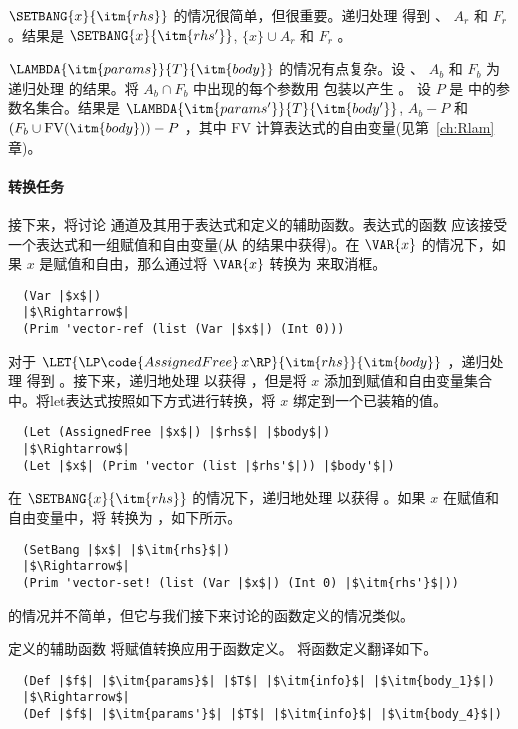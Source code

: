 \documentclass[11pt]{book}
\begin{document}
 $\SETBANG{x}{\itm{rhs}}$ 的情况很简单，但很重要。递归处理  得到  、 $A_r$
和 $F_r$ 。结果是 $\SETBANG{x}{\itm{rhs'}}$, $\{x\} \cup A_r$ 和 $F_r$ 。

 $\LAMBDA{\itm{params}}{T}{\itm{body}}$ 的情况有点复杂。设  、 $A_b$ 和 $F_b$ 为递归处理  的结果。将 $A_b \cap F_b$ 中出现的每个参数用  包装以产生  。
设 $P$ 是  中的参数名集合。结果是
$\LAMBDA{\itm{params'}}{T}{\itm{body'}}$, $A_b - P$ 和 $(F_b \cup
\mathrm{FV}(\itm{body})) - P$ ，其中 $\mathrm{FV}$ 计算表达式的自由变量(见第~\ref{ch:Rlam} 章)。

\paragraph{转换任务}

接下来，将讨论  通道及其用于表达式和定义的辅助函数。表达式的函数  应该接受一个表达式和一组赋值和自由变量(从
 的结果中获得)。在 $\VAR{x}$ 的情况下，如果 $x$ 是赋值和自由，那么通过将 $\VAR{x}$ 转换为  来取消框。
\begin{lstlisting}
  (Var |$x$|)
  |$\Rightarrow$|
  (Prim 'vector-ref (list (Var |$x$|) (Int 0)))
\end{lstlisting}
%
对于 $\LET{\LP\code{AssignedFree}\,
  x\RP}{\itm{rhs}}{\itm{body}}$ ，递归处理  得到  。接下来，递归地处理  以获得
 ，但是将 $x$ 添加到赋值和自由变量集合中。将let表达式按照如下方式进行转换，将 $x$ 绑定到一个已装箱的值。
\begin{lstlisting}
  (Let (AssignedFree |$x$|) |$rhs$| |$body$|)
  |$\Rightarrow$|
  (Let |$x$| (Prim 'vector (list |$rhs'$|)) |$body'$|)
\end{lstlisting}
%
在 $\SETBANG{x}{\itm{rhs}}$ 的情况下，递归地处理
 以获得  。如果 $x$ 在赋值和自由变量中，将  转换为 
，如下所示。
\begin{lstlisting}
  (SetBang |$x$| |$\itm{rhs}$|)
  |$\Rightarrow$|
  (Prim 'vector-set! (list (Var |$x$|) (Int 0) |$\itm{rhs'}$|))
\end{lstlisting}
%
  的情况并不简单，但它与我们接下来讨论的函数定义的情况类似。

定义的辅助函数  将赋值转换应用于函数定义。
将函数定义翻译如下。
\begin{lstlisting}
  (Def |$f$| |$\itm{params}$| |$T$| |$\itm{info}$| |$\itm{body_1}$|)
  |$\Rightarrow$|
  (Def |$f$| |$\itm{params'}$| |$T$| |$\itm{info}$| |$\itm{body_4}$|)
\end{lstlisting}
\end{document}
